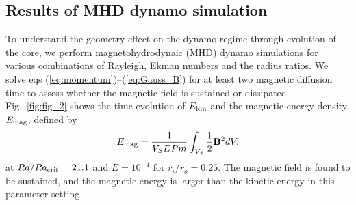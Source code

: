 \subsection{Results of MHD dynamo simulation}
To understand the geometry effect on the dynamo regime through evolution of the core, we perform magnetohydrodynaic (MHD) dynamo simulations for various combinations of Rayleigh, Ekman numbers and the radius ratios.
We solve eqs (\ref{eq:momentum})--(\ref{eq:Gauss_B}) for at least two magnetic diffusion time to assess whether the magnetic field is sustained or dissipated.
%
Fig.~\ref{fig:fig_2} shows the time evolution of $E_{\rm kin}$ and the magnetic energy density, $E_{\rm mag}$, defined by
%
\begin{equation}
E_{\rm mag} = \frac{1}{V_{S}E Pm} \int_{V_{S}} \frac{1}{2} \vec{B}^{2} dV,
\label{eq:magnetic_energy}
\end{equation}
%
at $Ra/Ra_{\rm crit} = 21.1$ and $E = 10^{-4}$ for $r_i/r_o = 0.25$.
The magnetic field is found to be sustained, and the magnetic energy is larger than the kinetic energy in this parameter setting.









